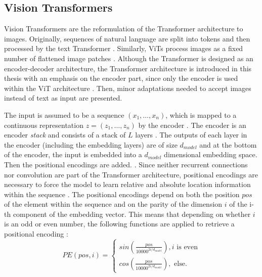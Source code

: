 \subsection{Vision Transformers}
\label{section: Vision Transformers}
Vision Transformers are the reformulation of the Transformer architecture \cite{Vaswani2017} to images.
Originally, sequences of natural language are split into tokens and then processed by the text Transformer \citep{Vaswani2017}.  
Similarly, ViTs process images as a fixed number of flattened image patches \citep{Dosovitskiy2020}.
Although the Transformer is designed as an encoder-decoder architecture, the Transformer architecture is introduced in this thesis with an emphasis on the encoder part, since only the encoder is used within the ViT architecture \citep{Dosovitskiy2020}.
Then, minor adaptations needed to accept images instead of text as input are presented.
\par
The input is assumed to be a sequence $(x_1,\dots,x_n)$, which is mapped to a continuous representation $z=(z_1,\dots,z_n)$ by the encoder \citep{Vaswani2017}.
The encoder is an encoder \textit{stack} and consists of a stack of $L$ layers \citep{Vaswani2017}.
The outputs of each layer in the encoder (including the embedding layers) are of size $d_{model}$ and at the bottom of the encoder, the input is embedded into a $d_{model}$ dimensional embedding space.
Then the positional encodings are added. \citep{Vaswani2017}.
Since neither recurrent connections nor convolution are part of the Transformer architecture, positional encodings are necessary to force the model to learn relative and absolute location information within the sequence \citep{Vaswani2017}.
The positional encodings depend on both the position $pos$ of the element within the sequence and on the parity of the dimension $i$ of the i-th component of the embedding vector.
This means that depending on whether $i$ is an odd or even number, the following functions are applied to retrieve a positional encoding \citep{Vaswani2017}:
\begin{equation}
	PE(pos, i) = 
	\begin{cases}
		sin(\frac{pos}{10000^{2i / d_{model}}}), i \text{ is even} \\
		cos(\frac{pos}{10000^{2i / d_{model}}}), \text{ else}.
	\end{cases}
	\label{equation:positional-encoding}
\end{equation}

